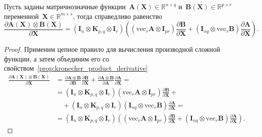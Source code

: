 \begin{lemma}\label{lemma:matrix_funcs_kronecker_product_derivative}
    Пусть заданы матричнозначные функции~$\mathbf{A}(\mathbf{X}) \in \mathbb{R}^{n \times q}$ и~$\mathbf{B}(\mathbf{X}) \in \mathbb{R}^{p \times r}$ переменной~$\mathbf{X} \in \mathbb{R}^{m \times s}$, тогда справедливо равенство
    \begin{equation}
        \frac{\partial\mathbf{A}(\mathbf{X}) \otimes \mathbf{B}(\mathbf{X})}{\partial \mathbf{X}} = (\mathbf{I}_n \otimes \mathbf{K}_{p,q} \otimes \mathbf{I}_r) \left( \left( \mathrm{vec}_r \mathbf{A} \otimes \mathbf{I}_{pr} \right) \frac{\partial\mathbf{B}}{\partial \mathbf{X}} + \left( \mathbf{I}_{nq} \otimes \mathrm{vec}_r \mathbf{B} \right) \frac{\partial\mathbf{A}}{\partial \mathbf{X}}\right).
    \end{equation}
\end{lemma}
\begin{proof}
    Применим цепное правило для вычисления производной сложной функции, а затем объединим его со свойством~\ref{prop:kronecker_product_derivative}
    \begin{align}
        \frac{\partial\mathbf{A}(\mathbf{X}) \otimes \mathbf{B}(\mathbf{X})}{\partial \mathbf{X}} &= \frac{\partial \mathbf{A}\otimes\mathbf{B}}{\partial\mathbf{B}}\frac{\partial\mathbf{B}}{\partial \mathbf{X}} + \frac{\partial \mathbf{A}\otimes\mathbf{B}}{\partial\mathbf{A}}\frac{\partial\mathbf{A}}{\partial \mathbf{X}} = \\
        &= (\mathbf{I}_n \otimes \mathbf{K}_{p,q} \otimes \mathbf{I}_r) \left( \mathrm{vec}_r \mathbf{A} \otimes \mathbf{I}_{pr} \right) \frac{\partial\mathbf{B}}{\partial \mathbf{X}} +\\
        &\quad+(\mathbf{I}_n \otimes \mathbf{K}_{p,q} \otimes \mathbf{I}_r) \left( \mathbf{I}_{nq} \otimes \mathrm{vec}_r \mathbf{B} \right) \frac{\partial\mathbf{A}}{\partial \mathbf{X}} = \\
        &= (\mathbf{I}_n \otimes \mathbf{K}_{p,q} \otimes \mathbf{I}_r) \left( \left( \mathrm{vec}_r \mathbf{A} \otimes \mathbf{I}_{pr} \right) \frac{\partial\mathbf{B}}{\partial \mathbf{X}} + \left( \mathbf{I}_{nq} \otimes \mathrm{vec}_r \mathbf{B} \right) \frac{\partial\mathbf{A}}{\partial \mathbf{X}}\right).
    \end{align}
\end{proof}

